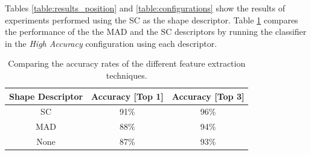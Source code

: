 Tables \ref{table:results_position} and \ref{table:configurations} show the results of experiments performed using the SC as the shape descriptor.
Table \ref{table:features_comparison} compares the performance of the the MAD and the SC descriptors by running the classifier in the \emph{High Accuracy} configuration using each descriptor.

\begin{table}
\centering
\caption{Comparing the accuracy rates of the different feature extraction techniques.}
\renewcommand{\arraystretch}{1.2}
\begin{tabular}{ | c | c | c |}
\hline
	\textbf{Shape Descriptor}  & \textbf{Accuracy [Top 1]}  & \textbf{Accuracy [Top 3]} \\
	\hline 
	SC      & 91\% & 96\%  \\                
  	\hline
  	MAD     & 88\% & 94\% \\
  	\hline
  	None    & 87\% & 93\% \\
  	\hline
\end{tabular}
\label{table:features_comparison} 
\end{table}


%
%
%

